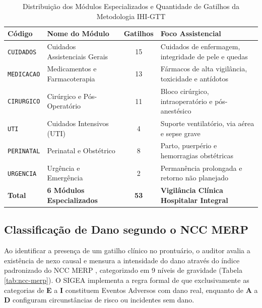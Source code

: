 \begin{table}[htbp]
\centering
\small
\caption{Distribuição dos Módulos Especializados e Quantidade de Gatilhos da Metodologia IHI-GTT}
\label{tab:modulos-gtt}
\begin{tabularx}{\textwidth}{l p{4.8cm} c X}
\toprule
\textbf{Código} & \textbf{Nome do Módulo} & \textbf{Gatilhos} & \textbf{Foco Assistencial} \\
\midrule
\texttt{CUIDADOS}  & Cuidados Assistenciais Gerais & 15 & Cuidados de enfermagem, integridade de pele e quedas \\
\texttt{MEDICACAO} & Medicamentos e Farmacoterapia & 13 & Fármacos de alta vigilância, toxicidade e antídotos \\
\texttt{CIRURGICO} & Cirúrgico e Pós-Operatório & 11 & Bloco cirúrgico, intraoperatório e pós-anestésico \\
\texttt{UTI}       & Cuidados Intensivos (UTI) & 4 & Suporte ventilatório, via aérea e sepse grave \\
\texttt{PERINATAL} & Perinatal e Obstétrico & 8 & Parto, puerpério e hemorragias obstétricas \\
\texttt{URGENCIA}  & Urgência e Emergência & 2 & Permanência prolongada e retorno não planejado \\
\midrule
\textbf{Total}     & \textbf{6 Módulos Especializados} & \textbf{53} & \textbf{Vigilância Clínica Hospitalar Integral} \\
\bottomrule
\end{tabularx}
\end{table}

\subsection{Classificação de Dano segundo o NCC MERP}
Ao identificar a presença de um gatilho clínico no prontuário, o auditor avalia a existência de nexo causal e mensura a intensidade do dano através do índice padronizado do NCC MERP \cite{nccmerp2001}, categorizado em 9 níveis de gravidade (Tabela \ref{tab:ncc-merp}). O SIGEA implementa a regra formal de que exclusivamente as categorias de \textbf{E} a \textbf{I} constituem Eventos Adversos com dano real, enquanto de \textbf{A} a \textbf{D} configuram circunstâncias de risco ou incidentes sem dano.

